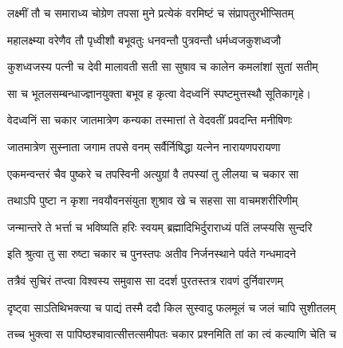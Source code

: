 


\storymeta



\twolineshloka
{लक्ष्मीं तौ च समाराध्य चोग्रेण तपसा मुने}
{प्रत्येकं वरमिष्टं च संप्रापतुरभीप्सितम्}%

\twolineshloka
{महालक्ष्म्या वरेणैव तौ पृध्वीशौ बभूवतुः}
{धनवन्तौ पुत्रवन्तौ धर्मध्वजकुशध्वजौ}%

\twolineshloka
{कुशध्वजस्य पत्नी च देवी मालावती सती}
{सा सुषाव च कालेन कमलांशां सुतां सतीम्}%

\twolineshloka
{सा च भूतलसम्बन्धाज्ज्ञानयुक्ता बभूव ह}
{कृत्वा वेदध्वनिं स्पष्टमुत्तस्थौ सूतिकागृहे।}%

\twolineshloka
{वेदध्वनिं सा चकार जातमात्रेण कन्यका}
{तस्मात्तां ते वेदवतीं प्रवदन्ति मनीषिणः}%

\twolineshloka
{जातमात्रेण सुस्नाता जगाम तपसे वनम्}
{सर्वैर्निषिद्धा यत्नेन नारायणपरायणा}%

\twolineshloka
{एकमन्वन्तरं चैव पुष्करे च तपस्विनी}
{अत्युग्रां वै तपस्यां तु लीलया च चकार सा}%

\twolineshloka
{तथाऽपि पुष्टा न कृशा नवयौवनसंयुता}
{शुश्राव खे च सहसा सा वाचमशरीरिणीम्}%

\twolineshloka
{जन्मान्तरे ते भर्त्ता च भविष्यति हरिः स्वयम्}
{ब्रह्मादिभिर्दुराराध्यं पतिं लप्स्यसि सुन्दरि}%

\twolineshloka
{इति श्रुत्वा तु सा रुष्टा चकार च पुनस्तपः}
{अतीव निर्जनस्थाने पर्वते गन्धमादने}%

\twolineshloka
{तत्रैवं सुचिरं तप्त्वा विश्वस्य समुवास सा}
{ददर्श पुरतस्तत्र रावणं दुर्निवारणम्}%

\twolineshloka
{दृष्ट्वा साऽतिथिभक्त्या च पाद्यं तस्मै ददौ किल}
{सुस्वादु फलमूलं च जलं चापि सुशीतलम्}%

\twolineshloka
{तच्च भुक्त्वा स पापिष्ठश्चावात्सीत्तत्समीपतः}
{चकार प्रश्नमिति तां का त्वं कल्याणि चेति च}%

